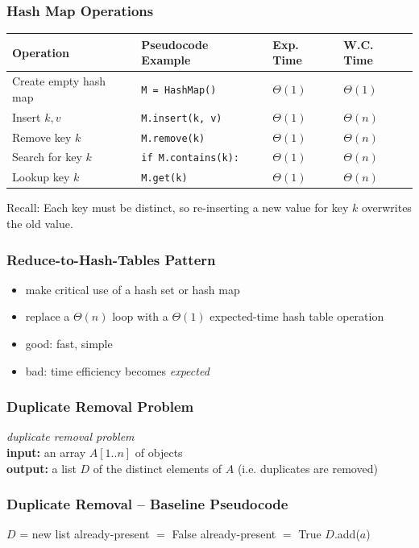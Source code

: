 \documentclass[10pt]{beamer}
\begin{document}
\begin{frame} \frametitle{Hash Map Operations}
  \begin{center}
    \begin{tabular}{llll}
      \textbf{Operation} & \textbf{Pseudocode Example} & \textbf{Exp. Time} & \textbf{W.C. Time} \\ \hline
      Create empty hash map & \texttt{M = HashMap()} & $\Theta(1)$ & $\Theta(1)$ \\
      Insert $k, v$ & \texttt{M.insert(k, v)} & $\Theta(1)$ & $\Theta(n)$ \\
      Remove key $k$ & \texttt{M.remove(k)} & $\Theta(1)$ & $\Theta(n)$ \\
      Search for key $k$ & \texttt{if M.contains(k):} & $\Theta(1)$ & $\Theta(n)$ \\
      Lookup key $k$ & \texttt{M.get(k)} & $\Theta(1)$ & $\Theta(n)$ \\
    \end{tabular}
  \end{center}

  \vspace{12pt}
  Recall: Each key must be distinct, so re-inserting a new value for key $k$ overwrites the old value.
\end{frame}

\begin{frame} \frametitle{Reduce-to-Hash-Tables Pattern}
\begin{itemize}
  \item make critical use of a hash set or hash map
  \item replace a $\Theta(n)$ loop with a $\Theta(1)$ expected-time hash table operation
  \item good: fast, simple
  \item bad: time efficiency becomes \emph{expected}
\end{itemize}
\end{frame}

\begin{frame} \frametitle{Duplicate Removal Problem}
  \emph{duplicate removal problem} \\
  \textbf{input:} an array $A[1..n]$ of objects\\
  \textbf{output:} a list $D$ of the distinct elements of $A$ (i.e. duplicates
    are removed)\\

\end{frame}

\begin{frame} \frametitle{Duplicate Removal -- Baseline Pseudocode}
  {\footnotesize
  \begin{algorithmic}[1]
    \State $D$ = new list
        \State already-present $ = $ False
            \State already-present $ = $ True
          \EndIf
        \EndFor
          \State $D$.add($a$)
        \EndIf
    \EndFor
    \State {}
    \EndFunction
  \end{algorithmic}
  }
\end{frame}
\end{document}
